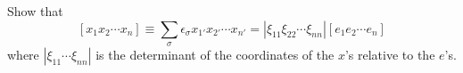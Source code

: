 Show that
$$[x_1 x_2 \cdots x_n] \equiv \sum_{\sigma} \epsilon_\sigma x_{1'} x_{2'} \cdots x_{n'} = |\xi_{11} \xi_{22} \cdots \xi_{nn}| [e_1 e_2 \cdots e_n]$$
where $|\xi_{11} \cdots \xi_{nn}|$ is the determinant of the coordinates of the $x$'s relative to the $e$'s.
